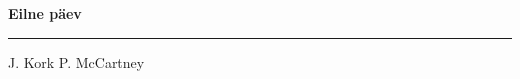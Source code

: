 \documentclass[10pt]{book}
\begin{document}
{
  \samepage
  \raggedbottom
  \raggedright
  \sloppy


  \vspace{0.2in}

  \noindent\begin{minipage}{.1\textwidth}
    \hfill\vspace{0.1in}
  \end{minipage}%
  \noindent\begin{minipage}{.8\textwidth}
    \centering
    \bfseries
    \large Eilne p\"aev
  \end{minipage}%
  \noindent\begin{minipage}{.1\textwidth}
      \hfill\vspace{0.1in}
  \end{minipage}

  \nopagebreak[4]
  \vspace{0.1in}
  \nopagebreak[4]
  \hrule height 0.05ex
  \nopagebreak[4]
  \vspace{-0.05in}

  {\footnotesize J. Kork \hfill P. McCartney }\\
  \vspace{0.01in}



}
\end{document}
